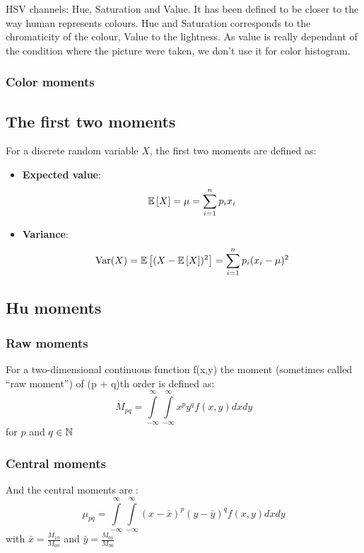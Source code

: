 HSV channels: Hue, Saturation and Value.
It has been defined to be closer to the way human represents colours.
Hue and Saturation corresponds to the chromaticity of the colour, Value to the lightness.
As value is really dependant of the condition where the picture were taken, we don't use it for color histogram.

\subsubsection{Color moments}

\subsection{The first two moments}

For a discrete random variable $X$, the first two moments are defined as:
\begin{itemize}
    \item \textbf{Expected value}: $$\mathbb{E} \left[ X \right] = \mu = \sum_{i = 1}^{n} p_i x_i $$
    \item \textbf{Variance}:  $$ \operatorname{Var} (X)= \mathbb{E} \left[ (X - \mathbb{E} \left[ X \right] )^2 \right] =\sum _{i=1}^{n} p_i (x_{i} - \mu )^{2} $$
\end{itemize}

\subsection{Hu moments}

\subsubsection{Raw moments}

For a two-dimensional continuous function f(x,y) the moment (sometimes called \enquote{raw moment}) of (p + q)th order is defined as: 
$$M_{pq}=\int \limits _{-\infty }^{\infty }\int \limits _{-\infty }^{\infty }x^{p}y^{q}f(x,y) dx dy $$
for $p$ and $q \in \mathbb{N} $

\subsubsection{Central moments}

And the central moments are :
$$\mu_{pq}=\int \limits_{-\infty }^{\infty }\int \limits _{-\infty}^{\infty} (x- \bar{x})^{p}(y - \bar{y})^{q} f(x,y) dx dy $$
with $\bar{x}=\frac{M_{10}}{M_{00}}$ and $\bar{y}=\frac{M_{01}}{M_{00}}$


